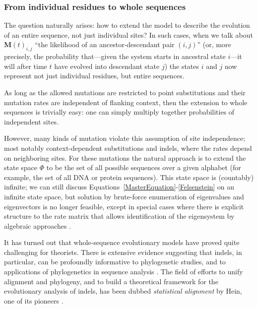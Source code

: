 \documentclass{bmcart}
\newcommand{\matr}[1]{\mathbf{#1}}
\newcommand{\statespace}{\Phi}
\newcommand{\condmatrix}{\matr{M}}
\begin{document}
\subsubsection*{From individual residues to whole sequences}

The question naturally arises: how to extend the model to describe the evolution of an entire sequence,
not just individual sites?
\color{red}
In such cases, when we talk about $\condmatrix(t)_{i,j}$ ``the likelihood of an ancestor-descendant pair $(i,j)$''
(or, more precisely, the probability that---given the system starts in ancestral state $i$---it will after time $t$ have evolved into descendant state $j$)
the states $i$ and $j$ now represent not just individual residues, but entire sequences.
\color{black}

As long as the allowed mutations are restricted to point substitutions
and their mutation rates are independent of flanking context,
then the extension to whole sequences is trivially easy:
one can simply multiply together probabilities of independent sites.

However, many kinds of mutation violate this assumption of site independence;
most notably context-dependent substitutions and indels, where the rates depend on neighboring sites.
For these mutations the natural approach is to extend the state space $\statespace$
to be the set of all possible sequences over a given alphabet
(for example, the set of all DNA or protein sequences).
This state space is (countably) infinite;
we can still discuss Equations~\ref{MasterEquation}-\ref{Felsenstein}
on an infinite state space,
but solution by brute-force enumeration of eigenvalues and eigenvectors is no longer feasible,
\color{red}
except in special cases where there is explicit structure to the rate matrix that allows identification of the eigensystem by algebraic approaches
\cite{LunterHein04,pmid21827770,pmid26135206}.
\color{black}

It has turned out that whole-sequence evolutionary models have proved quite challenging for theorists.
There is extensive evidence suggesting that indels, in particular, can be profoundly informative to phylogenetic studies,
and to applications of phylogenetics in sequence analysis \cite{pmid8445636,pmid15276848,pmid18578882,pmid23475937,pmid19958081,pmid16354754}.
The field of efforts to unify alignment and phylogeny,
and to build a theoretical framework for the evolutionary analysis of indels,
has been dubbed
{\em statistical alignment} by Hein, one of its pioneers \cite{HeinEtal2000}.
\end{document}
